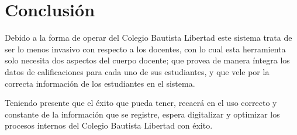\documentclass[12pt]{article}
\begin{document}
    \section{Conclusión}

    Debido a la forma de operar del Colegio Bautista Libertad este sistema trata de ser lo menos invasivo con respecto
    a los docentes, con lo cual esta herramienta solo necesita dos aspectos del cuerpo docente; que provea de manera
    íntegra los datos de calificaciones para cada uno de sus estudiantes, y que
    vele por la correcta información de los estudiantes en el sistema.

    Teniendo presente que el éxito que \wsm pueda tener, recaerá en el uso correcto y constante de la información que se
    registre, espera digitalizar y optimizar los procesos internos del Colegio Bautista Libertad con éxito.
\end{document}
